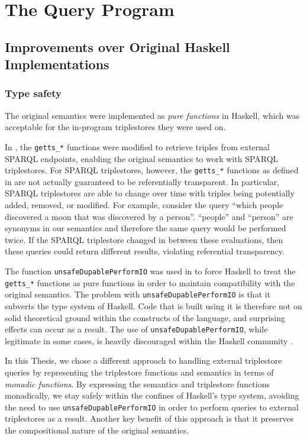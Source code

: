 \documentclass[../main.tex]{subfiles}
\begin{document}
\chapter{The Query Program}

\section{Improvements over Original Haskell Implementations}

\subsection{Type safety}

The original semantics were implemented as {\em pure functions} in Haskell, which was acceptable for the in-program triplestores they were used on.

In \cite{agboola2015extensible}, the \texttt{getts\_*} functions were modified to retrieve triples from external SPARQL endpoints, enabling the original
semantics to work with SPARQL triplestores.  For SPARQL triplestores, however, the \texttt{getts\_*} functions as defined in \cite{agboola2015extensible} are not actually guaranteed to be referentially transparent. In particular, SPARQL triplestores are able to change over time with triples being potentially added, removed, or modified.
For example, consider the query ``which people discovered a moon that was discovered by a person''.
``people'' and ``person'' are synonyms in our semantics and therefore the same query would be performed twice.  If the SPARQL triplestore changed in between these evaluations,
then these queries could return different results, violating referential transparency.

The function \texttt{unsafeDupablePerformIO} was used in \cite{agboola2015extensible} to force Haskell to treat the \texttt{getts\_*} functions as pure functions
in order to maintain compatibility with the original semantics. The problem with \texttt{unsafeDupablePerformIO} is that it subverts the type system of Haskell.  Code that is built using it is therefore not on
solid theoretical ground within the constructs of the language, and surprising effects can occur as a result.  The use of \texttt{unsafeDupablePerformIO}, while
legitimate in some cases, is heavily discouraged within the Haskell community \cite{noUnsafePerformIO}.

In this Thesis, we chose a different approach to handling external triplestore queries by representing the triplestore functions and semantics in terms of {\em monadic functions}.
By expressing the semantics and triplestore functions monadically, we stay safely within the confines of Haskell's type system, avoiding
the need to use \texttt{unsafeDupablePerformIO} in order to perform queries to external triplestores as a result.  Another key benefit of this approach is that it preserves the compositional nature of the original semantics.
\end{document}
